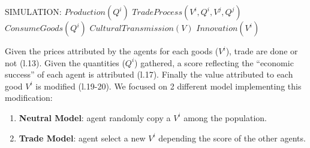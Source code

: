 \documentclass[a0paper,landscape,showframe]{baposter}
\newcommand{\compresslist}{
	\setlength{\itemsep}{1pt}
	\setlength{\parskip}{0pt}
	\setlength{\parsep}{0pt}
}
\begin{document}
\begin{poster}
{\begin{algorithm}[H]
\begin{algorithmic}[1]
	\State SIMULATION:
				\State $Production(Q^i)$
			\EndFor
					\State $TradeProcess(V^i,Q^i,V^j,Q^j)$
				\EndFor		
			\EndFor
				\State $ConsumeGoods(Q^i)$ 
					\State $CulturalTransmission(V)$
					\State $Innovation(V^i)$
				\EndIf
			\EndFor
		\EndLoop
\end{algorithmic}
\end{algorithm}
\vspace{-.3cm}
Given the prices attributed by the agents for each goods ($V^i$), trade are done or not (l.13). Given the quantities ($Q^i$) gathered, a score reflecting the ``economic success'' of each agent is attributed (l.17). Finally the value attributed to each good $V^i$ is modified (l.19-20).
We focused on 2 different model implementing this modification: 
\vspace{-.2cm}
\begin{enumerate}
		\compresslist
	\item \textbf{Neutral Model}: agent randomly copy a $V^i$ among the population.
	\item \textbf{Trade Model}: agent select a new $V^i$ depending the score of the other agents.
\end{enumerate}


}
\end{poster}
\end{document}
